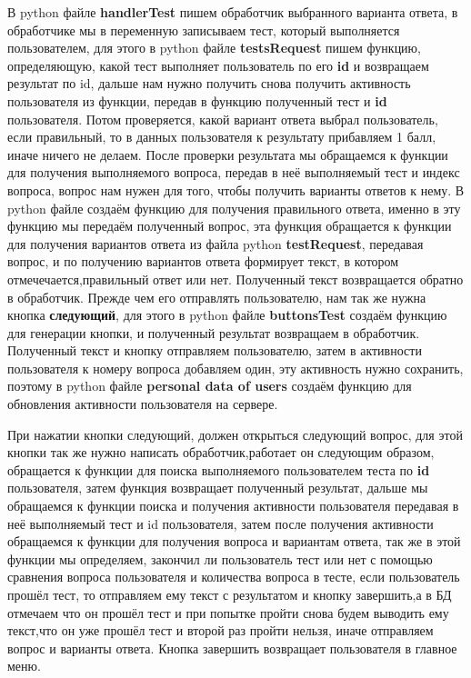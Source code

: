 \documentclass[12pt, oldlfont, amsfonts]{report}
\begin{document}
В python файле {\bf handlerTest} пишем обработчик выбранного варианта ответа, в обработчике мы в переменную записываем тест, который выполняется пользователем, для этого в python файле {\bf testsRequest} пишем функцию, определяющую, какой тест выполняет пользователь по его {\bf id} и возвращаем результат по id, дальше нам нужно получить снова получить активность пользователя из функции, передав в функцию полученный тест и {\bf id} пользователя. Потом проверяется, какой вариант ответа выбрал пользователь, если правильный, то в данных пользователя к результату прибавляем 1 балл, иначе ничего не делаем. После проверки результата мы обращаемся к функции для получения выполняемого вопроса, передав в неё выполняемый тест и индекс вопроса, вопрос нам нужен для того, чтобы получить варианты ответов к нему. В python файле создаём функцию для получения правильного ответа, именно в эту функцию мы передаём полученный вопрос, эта функция обращается к функции для получения вариантов ответа из файла python {\bf testRequest}, передавая вопрос, и по получению вариантов ответа формирует текст, в котором отмечечается,правильный ответ или нет. Полученный текст возвращается обратно в обработчик. Прежде чем его отправлять пользователю, нам так же нужна кнопка {\bf следующий}, для этого в python файле {\bf buttonsTest} создаём функцию для генерации кнопки, и полученный результат возвращаем в обработчик. Полученный текст и кнопку отправляем пользователю, затем в активности пользователя к номеру вопроса добавляем один, эту активность нужно сохранить, поэтому в python файле {\bf personal data of users} создаём функцию для обновления активности пользователя на сервере.

При нажатии кнопки следующий, должен открыться следующий вопрос, для этой кнопки так же нужно написать обработчик,работает он следующим образом, обращается к функции для поиска выполняемого пользователем теста по {\bf id} пользователя, затем функция возвращает полученный результат, дальше мы обращаемся к функции поиска и получения активности пользователя передавая в неё выполняемый тест и id пользователя, затем после получения активности обращаемся к функции для получения вопроса и вариантам ответа, так же в этой функции мы определяем, закончил ли пользователь тест или нет с помощью сравнения вопроса пользователя и количества вопроса в тесте, если пользователь прошёл тест, то отправляем ему текст с результатом и кнопку завершить,а в БД отмечаем что он прошёл тест и при попытке пройти снова будем выводить ему текст,что он уже прошёл тест и второй раз пройти нельзя, иначе отправляем вопрос и варианты ответа. Кнопка завершить возвращает пользователя в главное меню.
\end{document}
